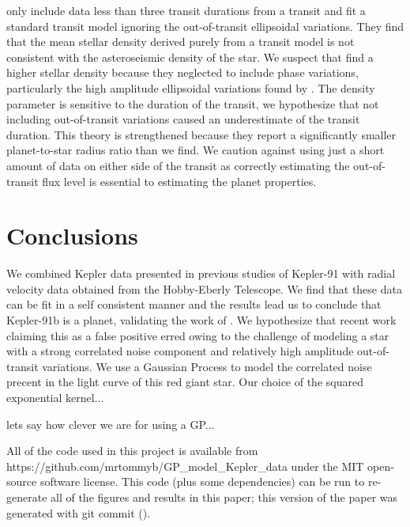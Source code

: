 \documentclass[apjl]{emulateapj}
\begin{document}
\citet{sliski14} only include data less than three transit durations from a transit and fit a standard transit model ignoring the out-of-transit ellipsoidal variations. They find that the mean stellar density derived purely from a transit model is not consistent with the asteroseismic density of the star. We suspect that \citeauthor{sliski14} find a higher stellar density because they neglected to include phase variations, particularly the high amplitude ellipsoidal variations found by \citet{lillo14}. The density parameter is sensitive to the duration of the transit, we hypothesize that not including out-of-transit variations caused an underestimate of the transit duration. This theory is strengthened because they report a significantly smaller planet-to-star radius ratio than we find. We caution against using just a short amount of data on either side of the transit as correctly estimating the out-of-transit flux level is essential to estimating the planet properties.



\section{Conclusions}
We combined Kepler data presented in previous studies of Kepler-91 with radial velocity data obtained from the Hobby-Eberly Telescope. We find that these data can be fit in a self consistent manner and the results lead us to conclude that Kepler-91b is a planet, validating the work of \citet{lillo14}. We hypothesize that recent work claiming this as a false positive erred owing to the challenge of modeling a star with a strong correlated noise component and relatively high amplitude out-of-transit variations. We use a Gaussian Process to model the correlated noise precent in the light curve of this red giant star. Our choice of the squared exponential kernel...

lets say how clever we are for using a GP...

All of the code used in this project is available from
{https://github.com/mrtommyb/GP\_model\_Kepler\_data} under the MIT
open-source software license.
This code (plus some dependencies) can be run to re-generate all of the
figures and results in this paper; this version of the paper was generated
with git commit \texttt{\githash} (\gitdate).
\end{document}
